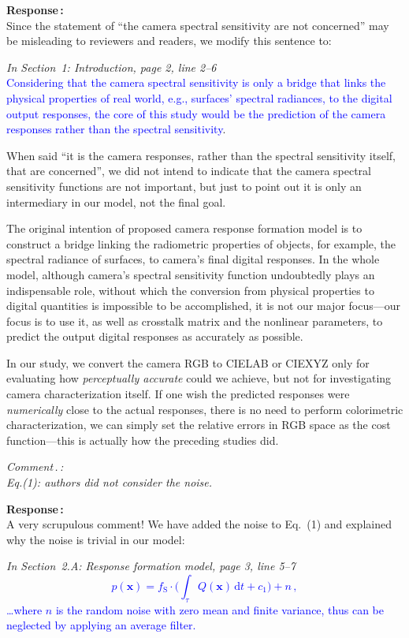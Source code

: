\documentclass[12pt]{article}
\newcounter{comment}
\newcounter{subcomment}[comment]
\renewcommand{\thecomment}{Comment\,\arabic{comment}}
\renewcommand{\thesubcomment}{\thecomment.\arabic{subcomment}}
\newcommand{\subcomment}[1]{\stepcounter{subcomment} \bigskip \noindent 
	\textsl{{\fontseries{b}\selectfont \thesubcomment\,:}\medskip\\ #1}\smallskip\par}
\newcommand{\reply}[1]{\noindent \textbf{\fontseries{b}\selectfont Response\,:}\medskip\\#1\medskip\par}
\newcommand{\add}[1]{\noindent\textcolor{blue}{#1}}
\newcommand{\pos}[1]{\noindent\emph{\small#1}}
\newcommand{\D}{\mathrm{d}}
\begin{document}
	\hypertarget{comment1.2}{}
	\reply{
		Since the statement of ``the camera spectral sensitivity are not concerned'' may be misleading to reviewers and readers, we modify this sentence to:
		
		\pos{In Section~1: Introduction, page 2, line 2--6}\\
		\add{Considering that the camera spectral sensitivity is only a bridge that links the physical properties of real world, e.g., surfaces’ spectral radiances, to the digital output responses, the core of this study would be the prediction of the camera responses rather than the spectral sensitivity}.
		
		When said ``it is the camera responses, rather than the spectral sensitivity itself, that are concerned'', we did not intend to indicate that the camera spectral sensitivity functions are not important, but just to point out it is only an intermediary in our model, not the final goal.
		
		The original intention of proposed camera response formation model is to construct a bridge linking the radiometric properties of objects, for example, the spectral radiance of surfaces, to camera's final digital responses. In the whole model, although camera's spectral sensitivity function undoubtedly plays an indispensable role, without which the conversion from physical properties to digital quantities is impossible to be accomplished, it is not our major focus---our focus is to use it, as well as crosstalk matrix and the nonlinear parameters, to predict the output digital responses as accurately as possible.
		
		In our study, we convert the camera RGB to CIELAB or CIEXYZ only for evaluating how \textit{perceptually accurate} could we achieve, but not for investigating camera characterization itself. If one wish the predicted responses were \textit{numerically} close to the actual responses, there is no need to perform colorimetric characterization, we can simply set the relative errors in RGB space as the cost function---this is actually how the preceding studies did.}\label{1.2}
	
	\subcomment{
		Eq.(1): authors did not consider the noise.}
	
	\hypertarget{comment1.3}{}
	\reply{
		A very scrupulous comment! We have added the noise to Eq.~(1) and explained why the noise is trivial in our model:
		
		\pos{In Section~2.A: Response formation model, page 3, line 5--7}\\
		\add{\begin{equation}
			p(\mathbf{x}) = f_\text{S}\cdot\Big(\int_\tau Q(\mathbf{x})\,\D{t}+c_1\Big)+n\,,
			\end{equation}
		\ldots where $n$ is the random noise with zero mean and finite variance, thus can be neglected by applying an average filter.}}
\end{document}
